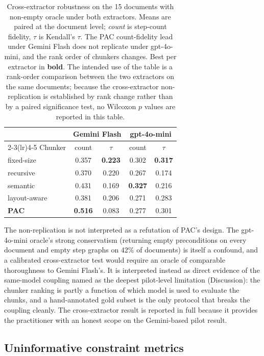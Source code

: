 \documentclass[fleqn,10pt]{wlscirep}
\begin{document}
\begin{table}[ht]
\centering
\caption{Cross-extractor robustness on the 15 documents with non-empty
oracle under both extractors. Means are paired at the document level;
\emph{count} is step-count fidelity, $\tau$ is Kendall's $\tau$.
The PAC count-fidelity lead under Gemini Flash does not replicate
under gpt-4o-mini, and the rank order of chunkers changes. Best per
extractor in \textbf{bold}. The intended use of the table is a
rank-order comparison between the two extractors on the same documents;
because the cross-extractor non-replication is established by rank
change rather than by a paired significance test, no Wilcoxon $p$
values are reported in this table.}
\label{tab:robust}
\begin{tabular}{lcccc}
\toprule
& \multicolumn{2}{c}{Gemini Flash}
& \multicolumn{2}{c}{gpt-4o-mini} \\
\cmidrule(lr){2-3}\cmidrule(lr){4-5}
Chunker & count & $\tau$ & count & $\tau$ \\
\midrule
fixed-size   & 0.357 & \textbf{0.223} & 0.302 & \textbf{0.317} \\
recursive    & 0.370 & 0.220 & 0.267 & 0.174 \\
semantic     & 0.431 & 0.169 & \textbf{0.327} & 0.216 \\
layout-aware & 0.381 & 0.206 & 0.271 & 0.283 \\
\textbf{PAC} & \textbf{0.516} & 0.083 & 0.277 & 0.301 \\
\bottomrule
\end{tabular}
\end{table}

The non-replication is not interpreted as a refutation of PAC's
design. The gpt-4o-mini oracle's strong conservatism (returning empty
preconditions on every document and empty step graphs on 42\% of
documents) is itself a confound, and a calibrated cross-extractor test
would require an oracle of comparable thoroughness to Gemini Flash's.
It is interpreted instead as direct evidence of the same-model
coupling named as the deepest pilot-level limitation (Discussion): the
chunker ranking is partly a function of which model is used to
evaluate the chunks, and a hand-annotated gold subset is the only
protocol that breaks the coupling cleanly. The cross-extractor result
is reported in full because it provides the practitioner with an
honest scope on the Gemini-based pilot result.

\subsection*{Uninformative constraint metrics}
\end{document}
